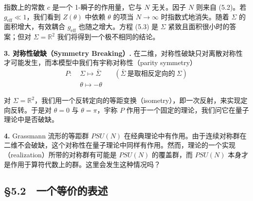 指数上的常数 $c$ 是一个 1-瞬子的作用量，它与 $N$ 无关。因子 $N$ 则来自 (5.2)。若 $g_{\mathrm{eff}}\ll1$，我们看到 $Z(\theta)$ 中依赖 $\theta$ 的项当 $N\to\infty$ 时指数式地消失。随着 $\Sigma$ 的面积增大，有效耦合 $g_{\mathrm{eff}}$ 也随之增大。方程 (5.3) 是 $\Sigma$ 紧致且面积很小时的答案；但对 $\Sigma=\mathbb{R}^2$ 我们将得到一个极不相同的结论。


\noindent\textbf{3. 对称性破缺（Symmetry Breaking）.} 在二维，对称性破缺只对离散对称性才可能发生，而本模型中我们有宇称对称性（parity symmetry）
\begin{equation}
  \tag{5.4}
  \label{eq:5-4}
  \begin{aligned}
    P:\;&\Sigma\longmapsto\bar\Sigma\qquad(\bar\Sigma\ \text{是取相反定向的}\ \Sigma)\\
    &\theta\longmapsto-\theta
  \end{aligned}
\end{equation}

对 $\Sigma=\mathbb{R}^2$，我们用一个反转定向的等距变换（isometry），即一次反射，来实现定向反转。于是对 $\theta=0$ 与 $\theta=\pi$，宇称 $P$ 作用于一个固定的理论，我们问它在量子理论中是否破缺。


\noindent\textbf{4.} Grassmann 流形的等距群 $PSU(N)$ 在经典理论中有作用。由于连续对称群在二维不会破缺，这个对称性在量子理论中同样有作用。然而，理论的一个实现（realization）所带的对称群有可能是 $PSU(N)$ 的覆盖群，而 $PSU(N)$ 本身才是作用于算符代数上的群。这里会发生这种情况吗？

\subsection*{§5.2　一个等价的表述}

